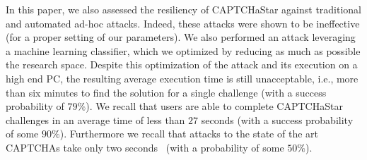\documentclass[conference]{IEEEtran}
\begin{document}
In this paper, we also assessed the resiliency of CAPTCHaStar against traditional and automated ad-hoc attacks.
Indeed, these attacks were shown to be ineffective (for a proper setting of our parameters). We also performed an attack leveraging a machine learning classifier, which we optimized by reducing as much as possible the research space.
Despite this optimization of the attack and its execution on a high end PC, the resulting average execution time is still unacceptable,
i.e., more than six minutes to find the solution for a single challenge (with a success probability of $79\%$).
We recall that users are able to complete CAPTCHaStar challenges in an average time of less than $27$ seconds (with a success probability of some $90\%$).
Furthermore we recall that attacks to the state of the art CAPTCHAs take only two seconds~\cite{bursztein2014end} (with a probability of some $50\%$).
\balance

\end{document}
